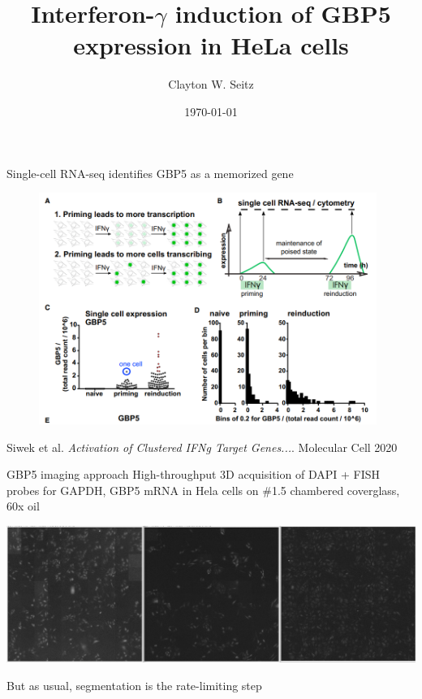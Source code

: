\documentclass[aspectratio=1610]{beamer}					%
\title{Interferon-$\gamma$ induction of GBP5 expression in HeLa cells}	%
\author{Clayton W. Seitz}								%
\date{\today}									%
\begin{document}
\begin{frame}
  \titlepage
\end{frame}


%

\begingroup
{}
\begin{frame}{Single-cell RNA-seq identifies GBP5 as a memorized gene}
\begin{figure}
\includegraphics[width=11cm]{figure-3.png}
\end{figure}
Siwek et al. \textit{Activation of Clustered IFNg Target Genes...}. Molecular Cell 2020
\end{frame}
\endgroup

\begin{frame}{GBP5 imaging approach}
High-throughput 3D acquisition of DAPI + FISH probes for GAPDH, GBP5 mRNA in Hela cells on \#1.5 chambered coverglass, 60x oil
\begin{center}
\includegraphics[width=1.0\textwidth]{Tiles.png}
\end{center}
But as usual, segmentation is the rate-limiting step
\end{frame}
\end{document}
